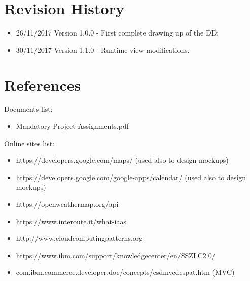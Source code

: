 \section{Revision History}
\begin{itemize}
\item	26/11/2017 Version 1.0.0 - First complete drawing up of the DD;
\item	30/11/2017 Version 1.1.0 - Runtime view modifications.
\end{itemize}
%
%
\section{References}
Documents list:
\begin{itemize}
\item Mandatory Project Assignments.pdf
\end{itemize}
Online sites list:
\begin{itemize}
\item	https://developers.google.com/maps/ (used also to design mockups)
\item	https://developers.google.com/google-apps/calendar/ (used also to design mockups)
\item	https://openweathermap.org/api
\item	https://www.interoute.it/what-iaas
\item	http://www.cloudcomputingpatterns.org
\item	https://www.ibm.com/support/knowledgecenter/en/SSZLC2.0/
\item	com.ibm.commerce.developer.doc/concepts/csdmvcdespat.htm (MVC)
\end{itemize}
%
%
